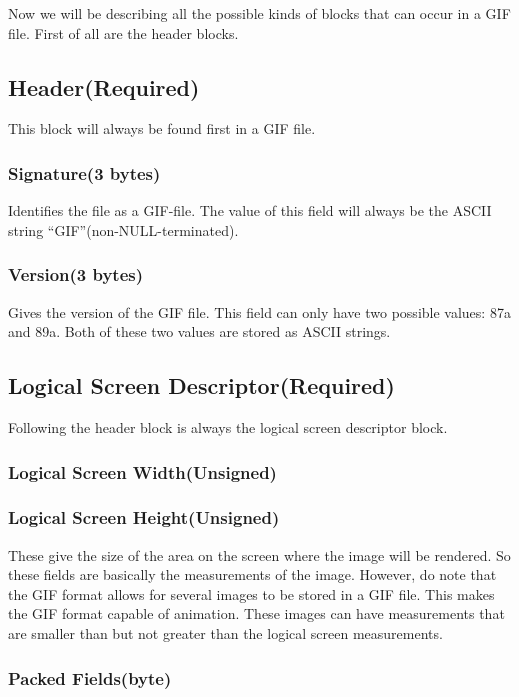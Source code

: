 Now we will be describing all the possible kinds of blocks that can
occur in a GIF file. First of all are the header blocks.

\subsection{Header(Required)}

This block will always be found first in a GIF file.

\subsubsection*{Signature(3 bytes)}

Identifies the file as a GIF-file. The value of this field will always
be the ASCII string ``GIF''(non-NULL-terminated).

\subsubsection{Version(3 bytes)}

Gives the version of the GIF file. This field can only have two
possible values: 87a and 89a. Both of these two values are stored as
ASCII strings.

\subsection{Logical Screen Descriptor(Required)}

Following the header block is always the logical screen descriptor
block.

\subsubsection{Logical Screen Width(Unsigned)}
\subsubsection{Logical Screen Height(Unsigned)}

These give the size of the area on the screen where the image will be
rendered. So these fields are basically the measurements of the
image. However, do note that the GIF format allows for several images
to be stored in a GIF file. This makes the GIF format capable of
animation. These images can have measurements that are smaller than
but not greater than the logical screen measurements.

\subsubsection{Packed Fields(byte)}

